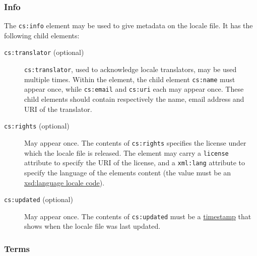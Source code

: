 \begin{Shaded}
\begin{Highlighting}[]
\NormalTok{    \textless{}/}\NormalTok{\textgreater{}}
\NormalTok{    \textless{}}\NormalTok{\textgreater{}}
\NormalTok{      \textless{}}\NormalTok{\textgreater{}}
\NormalTok{      \textless{}}\NormalTok{\textgreater{}}
\NormalTok{    \textless{}/}\NormalTok{\textgreater{}}
\NormalTok{  \textless{}/}\NormalTok{\textgreater{}}
\NormalTok{\textless{}/}\NormalTok{\textgreater{}}
\end{Highlighting}
\end{Shaded}

\hypertarget{info-1}{%
\subsubsection{Info}\label{info-1}}

The \texttt{cs:info} element may be used to give metadata on the locale
file. It has the following child elements:

\begin{description}
\item[\texttt{cs:translator} (optional)]
\texttt{cs:translator}, used to acknowledge locale translators, may be
used multiple times. Within the element, the child element
\texttt{cs:name} must appear once, while \texttt{cs:email} and
\texttt{cs:uri} each may appear once. These child elements should
contain respectively the name, email address and URI of the translator.
\item[\texttt{cs:rights} (optional)]
May appear once. The contents of \texttt{cs:rights} specifies the
license under which the locale file is released. The element may carry a
\texttt{license} attribute to specify the URI of the license, and a
\texttt{xml:lang} attribute to specify the language of the
element\textquotesingle s content (the value must be an
\href{http://books.xmlschemata.org/relaxng/ch19-77191.html}{xsd:language
locale code}).
\item[\texttt{cs:updated} (optional)]
May appear once. The contents of \texttt{cs:updated} must be a
\href{http://books.xmlschemata.org/relaxng/ch19-77049.html}{timestamp}
that shows when the locale file was last updated.
\end{description}

\hypertarget{terms}{%
\subsubsection{Terms}\label{terms}}


